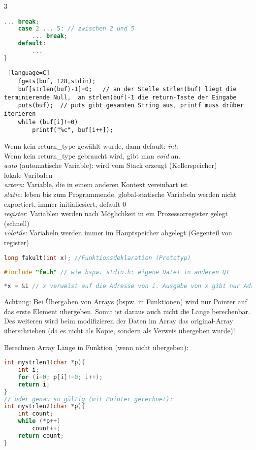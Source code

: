 \begin{multicols*}{3}
\begin{lstlisting}[language=C]
		... break;
	case 2 ... 5: // zwischen 2 und 5
		... break;
	default:
		...
}
\end{lstlisting}
\HRule[4pt]
\begin{lstlisting} [language=C]
	fgets(buf, 128,stdin);
	buf[strlen(buf)-1]=0;	// an der Stelle strlen(buf) liegt die terminierende Null,  an strlen(buf)-1 die return-Taste der Eingabe
	puts(buf);	// puts gibt gesamten String aus, printf muss drüber iterieren
	while (buf[i]!=0)
		printf("%c", buf[i++]);
\end{lstlisting}
\HRule[4pt]
Wenn kein return\_type gewählt wurde, dann default: \emph{int}.\\
Wenn kein return\_type gebraucht wird, gibt man \emph{void} an.
\\
\emph{auto} (automatische Variable): wird vom Stack erzeugt (Kellerspeicher)\\
lokale Varibalen\\
\emph{extern}: Variable, die in einem anderen Kontext vereinbart ist\\
\emph{static}: leben bis zum Programmende, global-statische Variabeln werden nicht exportiert, immer initialiesiert, default 0\\
\emph{register}: Variablen werden nach Möglichkeit in ein Prozessorregister gelegt (schnell)\\
\emph{volatile}: Variabeln werden immer im Hauptspeicher abgelegt (Gegenteil von register)
\begin{lstlisting}[language=C]
long fakult(int x);	//Funktionsdeklaration (Prototyp)
\end{lstlisting}
\begin{lstlisting}[language=C]
#include "fe.h" // wie bspw. stdio.h: eigene Datei in anderen QT
\end{lstlisting}
\HRule[4pt]
\begin{lstlisting}[language=C]
	*x = &i // x verweist auf die Adresse von i. Ausgabe von x gibt nur Adresse. *x (oder x[0]) (Dereferenzierung) ergibt Wert von i
\end{lstlisting}
Achtung: Bei Übergaben von Arrays (bspw. in Funktionen) wird nur Pointer auf das erste Element übergeben. Somit ist daraus auch nicht die Länge berechenbar. Des weiteren wird beim modifizieren der Daten im Array das original-Array überschrieben (da es nicht als Kopie, sondern als Verweis übergeben wurde)!

Berechnen Array Länge in Funktion (wenn nicht übergeben):
\begin{lstlisting}[language=C]
int mystrlen1(char *p){
	int i;
	for (i=0; p[i]!=0; i++);
	return i;
}
// oder genau so gültig (mit Pointer gerechnet):
int mystrlen2(char *p){
	int count;
	while (*p++)
		count++;
	return count;
}
\end{lstlisting}


\end{multicols*}
